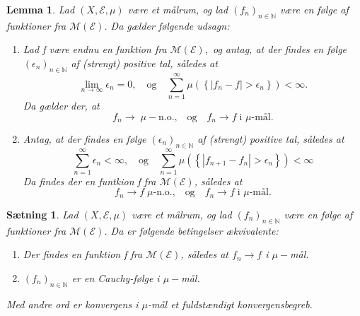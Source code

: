 \documentclass{article}
\newcommand{\N}{\mathbb{N}}
\newcommand{\1}{\mathbbm{1}}
\theoremstyle{boxed}
\newtheorem{lemma}[theorem]{Lemma}
\newtheorem{proposition}[theorem]{Sætning}
\begin{document}
\begin{theorem-box}
    \begin{lemma}
        Lad $(X,\mathcal{E},\mu)$ være et målrum, og lad $(f_n)_{n\in\N}$ være en følge af funktioner fra $\mathcal{M}(\mathcal{E})$. Da gælder følgende udsagn:
        \begin{enumerate}
            \item[\textnormal{(i)}] Lad f være endnu en funktion fra $\mathcal{M}(\mathcal{E}),$ og antag, at der findes en følge $(\epsilon_n)_{n\in\N}$ af (strengt) positive tal, således at
            $$\lim_{n\rightarrow \infty}\epsilon_n = 0, \quad \text{og}\quad \sum_{n=1}^{\infty}\mu\left(\left\{|f_n-f|>\epsilon_n\right\}\right)<\infty.$$
            Da gælder der, at
            $$f_n\rightarrow\; \mu-\text{n.o.,}\quad \text{og}\quad f_n\rightarrow f \; \text{i }\mu\text{-mål.}$$
            \item[\textnormal{(ii)}] Antag, at der findes en følge $(\epsilon_n)_{n\in\N}$ af (strengt) positive tal, således at
            $$\sum_{n=1}^{\infty}\epsilon_n < \infty,\quad \text{og} \quad \sum_{n=1}^{\infty} \mu\left(\left\{|f_{n+1}-f_n|>\epsilon_n\right\}\right)<\infty $$
            Da findes der en funtkion f fra $\mathcal{M}(\mathcal{E})$, således at
            $$f_n \rightarrow f \;\mu\text{-n.o.,}\quad \text{og} \quad f_n\rightarrow f \; \text{i }\mu\text{-mål.}$$ 
        \end{enumerate}
    \end{lemma}
\end{theorem-box}
\begin{theorem-box}
    \begin{proposition}
        Lad $(X,\mathcal{E},\mu)$ være et målrum, og lad $(f_n)_{n\in\N}$ være en følge af funktioner fra $\mathcal{M}(\mathcal{E})$. Da er følgende betingelser ækvivalente:
        \begin{enumerate}
            \item[\textnormal{(i)}] Der findes en funktion f fra $\mathcal{M}(\mathcal{E})$, således at $f_n\rightarrow f$ i $\mu-$mål.
            \item[\textnormal{(ii)}] $(f_n)_{n\in\N}$ er en Cauchy-følge i $\mu-$mål.
        \end{enumerate}
        Med andre ord er konvergens i $\mu$-mål et fuldstændigt konvergensbegreb.
        \end{proposition}
\end{theorem-box}
\end{document}
